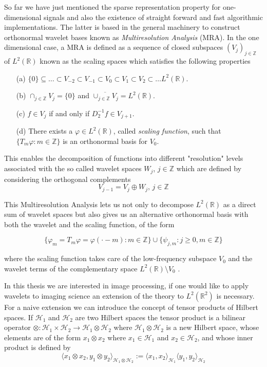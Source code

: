 \bigskip

So far we have just mentioned the sparse representation property for one-dimensional signals and also the existence of straight forward and fast algorithmic implementations. The latter is based in the general machinery to construct orthonormal wavelet bases known as \textit{Multiresolution Analysis} (MRA). In the one dimensional case, a MRA is defined as a sequence of closed subspaces $(V_j)_{j\in\mathbb{Z}}$ of $L^2(\mathbb{R})$ known as the scaling spaces which satisfies the following properties

\begin{enumerate}
\item[(a)] $\{0\}\subseteq\ldots\subset V_{-2}\subset V_{-1}\subset V_0\subset V_1\subset V_2\subset\ldots L^2(\mathbb{R})$.
\item[(b)] $\cap_{j\in\mathbb{Z}}V_j=\{0\}$ and $\overline{\cup_{j\in\mathbb{Z}}V_j}=L^2(\mathbb{R})$.
\item[(c)] $f\in V_j$ if and only if $D_2^{-1}f\in V_{j+1}$.
\item[(d)] There exists a $\varphi\in L^2(\mathbb{R})$, called \textit{scaling function}, such that $\{T_m\varphi:m\in\mathbb{Z}\}$ is an orthonormal basis for $V_0$.
\end{enumerate}

This enables the decomposition of functions into different "resolution" levels associated with the so called wavelet spaces $W_j$, $j\in\mathbb{Z}$ which are defined by considering the orthogonal complements
$$
V_{j-1}= V_j\oplus W_j\text{,  } j\in\mathbb{Z}
$$

This Multiresolution Analysis lets us not only to decompose $L^2(\mathbb{R})$ as a direct sum of wavelet spaces but also gives us an alternative orthonormal basis with both the wavelet and the scaling function, of the form

$$
\{\varphi_m=T_m\varphi=\varphi(\cdot-m):m\in\mathbb{Z}\}\cup\{\psi_{j,m}:j\geq 0,m\in\mathbb{Z}\}
$$

where the scaling function takes care of the low-frequency subspace $V_0$ and the wavelet terms of the complementary space $L^2(\mathbb{R})\setminus V_0$ \cite{Mallat}. 

\bigskip

In this thesis we are interested in image processing, if one would like to apply wavelets to imaging science an extension of the theory to $L^2(\mathbb{R}^2)$ is necessary. For a naive extension we can introduce the concept of tensor products of Hilbert spaces. If $\mathcal{H}_1$ and $\mathcal{H}_2$ are two Hilbert spaces the tensor product is a bilinear operator $\otimes:\mathcal{H}_1\times\mathcal{H}_2\longrightarrow \mathcal{H}_1\otimes\mathcal{H}_2$ where $\mathcal{H}_1\otimes\mathcal{H}_2$ is a new Hilbert space, whose elements are of the form $x_1\otimes x_2$ where $x_1\in\mathcal{H}_1$ and $x_2\in\mathcal{H}_2$, and whose inner product is defined by 
$$
\langle x_1\otimes x_2,y_1\otimes y_2\rangle_{\mathcal{H}_1\otimes\mathcal{H}_2}:=\langle x_1,x_2\rangle_{\mathcal{H}_1}\langle y_1,y_2\rangle_{\mathcal{H}_2}
$$

